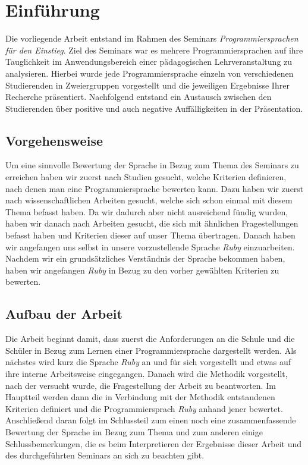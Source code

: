\documentclass[12pt,DIV=14, version=first, BCOR=10mm,a4paper,twoside,parskip=half-,headsepline,headinclude]{scrartcl}
\begin{document}
\section{Einführung}
\begin{flushleft}
Die vorliegende Arbeit entstand im Rahmen des Seminars \textit{\glqq Programmiersprachen für den Einstieg\grqq}. Ziel des Seminars war es mehrere Programmiersprachen auf ihre Tauglichkeit im Anwendungsbereich einer pädagogischen Lehrveranstaltung zu analysieren. Hierbei wurde jede Programmiersprache einzeln von verschiedenen Studierenden in Zweiergruppen vorgestellt und die jeweiligen Ergebnisse Ihrer Recherche präsentiert. Nachfolgend entstand ein Austausch zwischen den Studierenden über positive und auch negative Auffälligkeiten in der Präsentation.
\end{flushleft}

\subsection{Vorgehensweise}
\begin{flushleft}
Um eine sinnvolle Bewertung der Sprache in Bezug zum Thema des Seminars zu erreichen haben wir zuerst nach Studien gesucht, welche Kriterien definieren, nach denen man eine Programmiersprache bewerten kann. Dazu haben wir zuerst nach wissenschaftlichen Arbeiten gesucht, welche sich schon einmal mit diesem Thema befasst haben. Da wir dadurch aber nicht ausreichend fündig wurden, haben wir danach nach Arbeiten gesucht, die sich mit ähnlichen Fragestellungen befasst haben und Kriterien dieser auf unser Thema übertragen. Danach haben wir angefangen uns selbst in unsere vorzustellende Sprache \textit{\glqq Ruby\grqq} einzuarbeiten. Nachdem wir ein grundsätzliches Verständnis der Sprache bekommen haben, haben wir angefangen \textit{\glqq Ruby\grqq} in Bezug zu den vorher gewählten Kriterien zu bewerten.
\end{flushleft}

\subsection{Aufbau der Arbeit}
\begin{flushleft}
Die Arbeit beginnt damit, dass zuerst die Anforderungen an die Schule und die Schüler in Bezug zum Lernen einer Programmiersprache dargestellt werden. Als nächstes wird kurz die Sprache \textit{\glqq Ruby\grqq} an und für sich vorgestellt und etwas auf ihre interne Arbeitsweise eingegangen. Danach wird die Methodik vorgestellt, nach der versucht wurde, die Fragestellung der Arbeit zu beantworten. Im Hauptteil werden dann die in Verbindung mit der Methodik entstandenen Kriterien definiert und die Programmiersprach \textit{\glqq Ruby\grqq} anhand jener bewertet. Anschließend daran folgt im Schlussteil zum einen noch eine zusammenfassende Bewertung der Sprache im Bezug zum Thema und zum anderen einige Schlussbemerkungen, die es beim Interpretieren der Ergebnisse dieser Arbeit und des durchgeführten Seminars an sich zu beachten gibt.
\end{flushleft}
\end{document}
